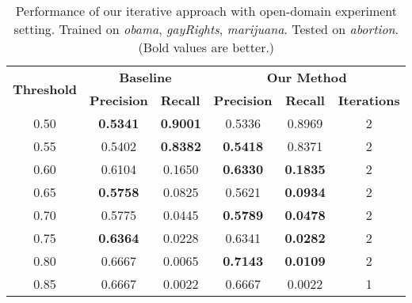 \documentclass[11pt,a4paper]{article}
\begin{document}
\begin{table*}[h]
\begin{center}
\begin{tabular}{|c||c|c|c|c|c|}
\hline
\multicolumn{1}{|c|}{\multirow{2}{*}{\bf Threshold}} & \multicolumn{2}{c|}{\bf Baseline}  & \multicolumn{3}{c|}{\bf Our Method}    \\ \cline{2-6} 
\multicolumn{1}{|c|}{}   & \multicolumn{1}{l|}{\bf Precision} & \multicolumn{1}{l|}{\bf Recall} & \multicolumn{1}{l|}{\bf Precision} & \multicolumn{1}{c|}{\bf Recall} & \multicolumn{1}{l|}{\bf Iterations} \\ \hline
 \hline
0.50 &\bf 0.5341 &\bf 0.9001 & 0.5336 & 0.8969 & 2 \\
0.55 & 0.5402 &\bf 0.8382 &\bf 0.5418 & 0.8371 & 2 \\
0.60 & 0.6104 & 0.1650 &\bf 0.6330 &\bf 0.1835 & 2 \\
0.65 &\bf 0.5758 & 0.0825 & 0.5621 &\bf 0.0934 & 2 \\
0.70 & 0.5775 & 0.0445 &\bf 0.5789 &\bf 0.0478 & 2 \\
0.75 &\bf 0.6364 & 0.0228 & 0.6341 &\bf 0.0282 & 2 \\
0.80 & 0.6667 & 0.0065 &\bf 0.7143 &\bf 0.0109 & 2 \\
0.85 & 0.6667 & 0.0022 & 0.6667 & 0.0022 & 1
\\\hline
\end{tabular}
\end{center}
\caption{\label{tab:cross-abortion} Performance of our iterative approach with open-domain experiment setting. Trained on {\it obama}, {\it gayRights}, {\it marijuana}. Tested on {\it abortion}. (Bold values are better.)}
\end{table*}
\end{document}
